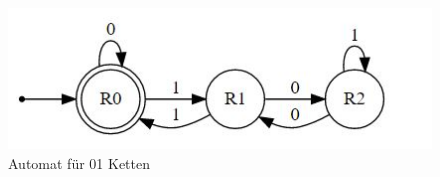 \documentclass[11pt, a4paper, twoside]{article}   	%
\begin{document}
\begin{figure}[h]
\centering
\includegraphics[scale=0.55]{01state-machine.JPG}
\caption{Automat für 01 Ketten}
\label{fig:5-state-machine-01}
\end{figure}
\end{document}
